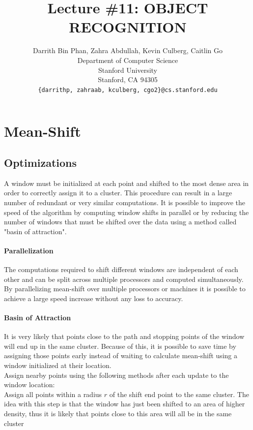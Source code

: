 \documentclass{article}
\title{Lecture \#11: OBJECT RECOGNITION}
\author{
  Darrith Bin Phan, Zahra Abdullah, Kevin Culberg, Caitlin Go \\
  Department of Computer Science\\
  Stanford University\\
  Stanford, CA 94305 \\
  \texttt{\{darrithp, zahraab, kculberg, cgo2\}@cs.stanford.edu} \\
}
\begin{document}
\maketitle

\section{Mean-Shift}

\subsection{Optimizations}

A window must be initialized at each point and shifted to the most dense area in order to correctly assign it to a cluster. This procedure can result in a large number of redundant or very similar computations. It is possible to improve the speed of the algorithm by computing window shifts in parallel or by reducing the number of windows that must be shifted over the data using a method called "basin of attraction".

\paragraph{Parallelization}
The computations required to shift different windows are independent of each other and can be split across multiple processors and computed simultaneously. By parallelizing mean-shift over multiple processors or machines it is possible to achieve a large speed increase without any loss to accuracy.

\paragraph{Basin of Attraction}
It is very likely that points close to the path and stopping points of the window will end up in the same cluster. Because of this, it is possible to save time by assigning those points early instead of waiting to calculate mean-shift using a window initialized at their location. \\
Assign nearby points using the following methods after each update to the window location: \\
Assign all points within a radius $r$ of the shift end point to the same cluster. The idea with this step is that the window has just been shifted to an area of higher density, thus it is likely that points close to this area will all be in the same cluster
\end{document}
